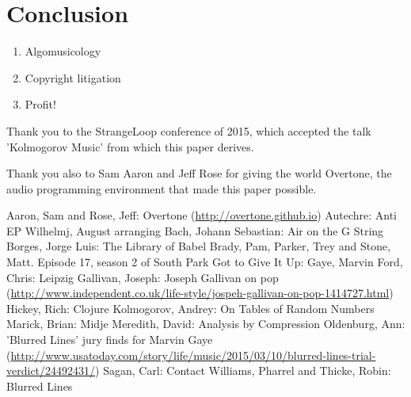 \documentclass[numbers]{sigplanconf}
\begin{document}
\section{Conclusion}

\begin{enumerate}
    \item Algomusicology
    \item Copyright litigation
    \item Profit!
\end{enumerate}

\acks

Thank you to the StrangeLoop conference of 2015, which accepted the talk 'Kolmogorov Music' from which this paper derives.

Thank you also to Sam Aaron and Jeff Rose for giving the world Overtone\cite{Overtone}, the audio programming environment
that made this paper possible.




\begin{thebibliography}{}
\softraggedright

 Aaron, Sam and Rose, Jeff: Overtone (\url{http://overtone.github.io})
 Autechre: Anti EP
 Wilhelmj, August arranging Bach, Johann Sebastian: Air on the G String
 Borges, Jorge Luis: The Library of Babel
 Brady, Pam, Parker, Trey and Stone, Matt. Episode 17, season 2 of South Park
 Got to Give It Up: Gaye, Marvin
 Ford, Chris: Leipzig
 Gallivan, Joseph: Joseph Gallivan on pop (\url{http://www.independent.co.uk/life-style/jospeh-gallivan-on-pop-1414727.html})
 Hickey, Rich: Clojure
  Kolmogorov, Andrey: On Tables of Random Numbers
 Marick, Brian: Midje
 Meredith, David: Analysis by Compression
 Oldenburg, Ann: 'Blurred Lines' jury finds for Marvin Gaye (\url{http://www.usatoday.com/story/life/music/2015/03/10/blurred-lines-trial-verdict/24492431/})
 Sagan, Carl: Contact
 Williams, Pharrel and Thicke, Robin: Blurred Lines

\end{thebibliography}
\end{document}
